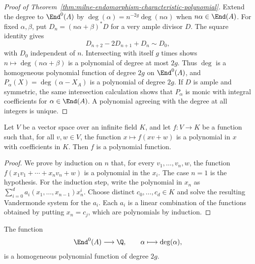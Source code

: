 \begin{proof}[Proof of Theorem~\ref{thm:milne-endomorphism-characteristic-polynomial}]
Extend the degree to $\End^0(A)$ by
$\deg(\alpha)=n^{-2g}\deg(n\alpha)$ when $n\alpha\in\End(A)$.  For fixed
$\alpha,\beta$, put $D_n=(n\alpha+\beta)^*D$ for a very ample divisor $D$.
The square identity gives
\[
D_{n+2}-2D_{n+1}+D_n\sim D_0,
\]
with $D_0$ independent of $n$.  Intersecting with itself $g$ times shows
$n\mapsto\deg(n\alpha+\beta)$ is a polynomial of degree at most $2g$.
Thus $\deg$ is a homogeneous polynomial function of degree $2g$ on
$\End^0(A)$, and $P_\alpha(X)=\deg(\alpha-X_A)$ is a polynomial of degree
$2g$.  If $D$ is ample and symmetric, the same intersection calculation
shows that $P_\alpha$ is monic with integral coefficients for
$\alpha\in\End(A)$.  A polynomial agreeing with the degree at all integers is
unique.
\end{proof}

\begin{lemma}
\label{lem:milne-polynomial-function}

Let $V$ be a vector space over an infinite field $K$, and let $f:V\to K$ be
a function such that, for all $v,w\in V$, the function
$x\mapsto f(xv+w)$ is a polynomial in $x$ with coefficients in $K$.  Then
$f$ is a polynomial function.
\end{lemma}

\begin{proof}
We prove by induction on $n$ that, for every $v_1,\ldots,v_n,w$, the
function $f(x_1v_1+\cdots+x_nv_n+w)$ is a polynomial in the $x_i$.  The case
$n=1$ is the hypothesis.  For the induction step, write the polynomial in
$x_n$ as $\sum_{i=0}^d a_i(x_1,\ldots,x_{n-1})x_n^i$.  Choose distinct
$c_0,\ldots,c_d\in K$ and solve the resulting Vandermonde system for the
$a_i$.  Each $a_i$ is a linear combination of the functions obtained by
putting $x_n=c_j$, which are polynomials by induction.
\end{proof}

\begin{proposition}
\label{prop:milne-degree-polynomial-function}

The function
\[
\End^0(A)\longrightarrow\Q,\qquad \alpha\longmapsto\deg(\alpha),
\]
is a homogeneous polynomial function of degree $2g$.
\end{proposition}


